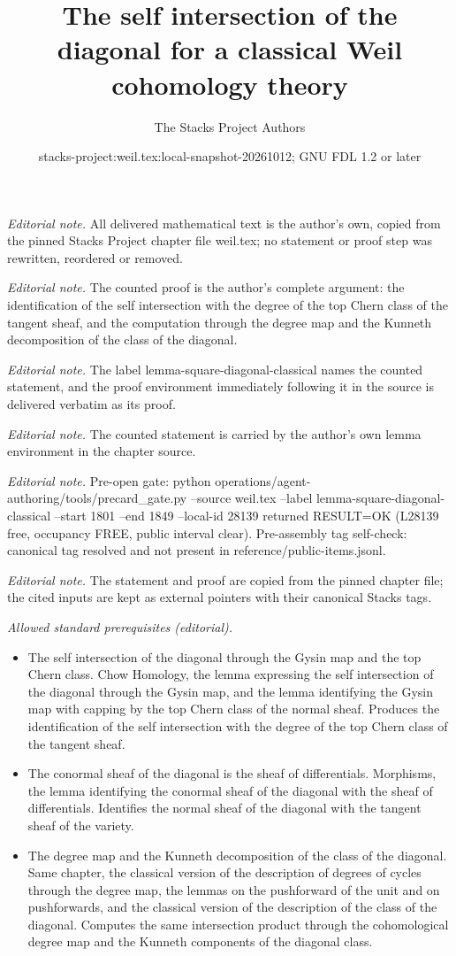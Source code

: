 \documentclass[10pt,a4paper]{amsart}
\title{The self intersection of the diagonal for a classical Weil cohomology theory}
\author{The Stacks Project Authors}
\date{stacks-project:weil.tex:local-snapshot-20261012; GNU FDL 1.2 or later}
\theoremstyle{plain}
\theoremstyle{definition}
\theoremstyle{remark}
\numberwithin{equation}{subsection}
\begin{document}
\maketitle
\noindent\textit{Editorial note.} All delivered mathematical text is the author's own, copied from the pinned Stacks Project chapter file weil.tex; no statement or proof step was rewritten, reordered or removed.\par\medskip
\noindent\textit{Editorial note.} The counted proof is the author's complete argument: the identification of the self intersection with the degree of the top Chern class of the tangent sheaf, and the computation through the degree map and the Kunneth decomposition of the class of the diagonal.\par\medskip
\noindent\textit{Editorial note.} The label lemma-square-diagonal-classical names the counted statement, and the proof environment immediately following it in the source is delivered verbatim as its proof.\par\medskip
\noindent\textit{Editorial note.} The counted statement is carried by the author's own lemma environment in the chapter source.\par\medskip
\noindent\textit{Editorial note.} Pre-open gate: python operations/agent-authoring/tools/precard\_gate.py --source weil.tex --label lemma-square-diagonal-classical --start 1801 --end 1849 --local-id 28139 returned RESULT=OK (L28139 free, occupancy FREE, public interval clear). Pre-assembly tag self-check: canonical tag resolved and not present in reference/public-items.jsonl.\par\medskip
\noindent\textit{Editorial note.} The statement and proof are copied from the pinned chapter file; the cited inputs are kept as external pointers with their canonical Stacks tags.\par\medskip
\noindent\textit{Allowed standard prerequisites (editorial).}\begin{itemize}
\item The self intersection of the diagonal through the Gysin map and the top Chern class. Chow Homology, the lemma expressing the self intersection of the diagonal through the Gysin map, and the lemma identifying the Gysin map with capping by the top Chern class of the normal sheaf. Produces the identification of the self intersection with the degree of the top Chern class of the tangent sheaf.
\item The conormal sheaf of the diagonal is the sheaf of differentials. Morphisms, the lemma identifying the conormal sheaf of the diagonal with the sheaf of differentials. Identifies the normal sheaf of the diagonal with the tangent sheaf of the variety.
\item The degree map and the Kunneth decomposition of the class of the diagonal. Same chapter, the classical version of the description of degrees of cycles through the degree map, the lemmas on the pushforward of the unit and on pushforwards, and the classical version of the description of the class of the diagonal. Computes the same intersection product through the cohomological degree map and the Kunneth components of the diagonal class.
\end{itemize}\medskip
\end{document}
